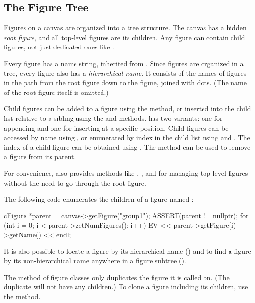 \subsection{The Figure Tree}
\label{sec:graphics:figure-tree}

Figures on a canvas are organized into a tree structure. The canvas has a hidden
\textit{root figure}, and all top-level figures are its children. Any figure can
contain child figures, not just dedicated ones like .

Every figure has a name string, inherited from . Since
figures are organized in a tree, every figure also has a \textit{hierarchical
name}. It consists of the names of figures in the path from the root figure down
to the figure, joined with dots. (The name of the root figure itself is
omitted.)

Child figures can be added to a figure using the  method, or
inserted into the child list relative to a sibling using the
 and  methods. 
has two variants: one for appending and one for inserting at a specific
position. Child figures can be accessed by name using ,
or enumerated by index in the child list using  and
. The index of a child figure can be obtained using
. The  method can be used to
remove a figure from its parent.

For convenience,  also provides methods like
, , and  for
managing top-level figures without the need to go through the root figure.

The following code enumerates the children of a figure named :

\begin{cpp}
cFigure *parent = canvas->getFigure("group1");
ASSERT(parent != nullptr);
for (int i = 0; i < parent->getNumFigures(); i++)
    EV << parent->getFigure(i)->getName() << endl;
\end{cpp}

It is also possible to locate a figure by its hierarchical name
() and to find a figure by its non-hierarchical name
anywhere in a figure subtree ().

The  method of figure classes only duplicates the figure it is
called on. (The duplicate will not have any children.) To clone a figure
including its children, use the  method.


